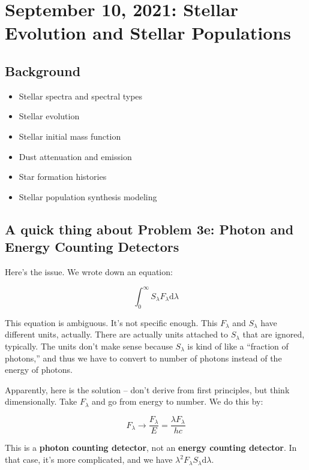\documentclass{article}
\begin{document}
\section{September 10, 2021: Stellar Evolution and Stellar Populations}

\subsection{Background}

\begin{itemize}
    \item Stellar spectra and spectral types
    \item Stellar evolution
    \item Stellar initial mass function
    \item Dust attenuation and emission
    \item Star formation histories
    \item Stellar population synthesis modeling
\end{itemize}

\subsection{A quick thing about Problem 3e: Photon and Energy Counting Detectors}

Here's the issue. We wrote down an equation:

\begin{equation}
    \int_0^\infty S_\lambda F_\lambda \mathrm{d}\lambda
\end{equation}

This equation is ambiguous. It's not specific enough. This $F_\lambda$ and $S_\lambda$ have different units, actually. There are actually units attached to $S_\lambda$ that are ignored, typically. The units don't make sense because $S_\lambda$ is kind of like a ``fraction of photons,'' and thus we have to convert to number of photons instead of the energy of photons. 

Apparently, here is the solution -- don't derive from first principles, but think dimensionally. Take $F_\lambda$ and go from energy to number. We do this by:

\begin{equation}
    F_\lambda \rightarrow \frac{F_\lambda}{E} = \frac{\lambda F_\lambda}{hc}
\end{equation}

This is a \textbf{photon counting detector}, not an \textbf{energy counting detector}. In that case, it's more complicated, and we have $\lambda^2 F_\lambda S_\lambda \mathrm{d}\lambda$.
\end{document}
